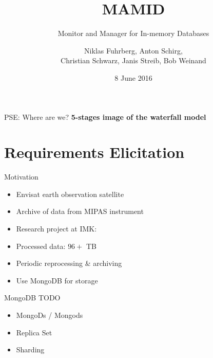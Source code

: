 \documentclass[11pt,aspectratio=169]{beamer}
\begin{document}
   	\author{Niklas Fuhrberg, Anton Schirg,\\ Christian Schwarz, Janis Streib, Bob Weinand}
    \title{MAMID}
    \subtitle{Monitor and Manager for In-memory Databases}
    \date{8 June 2016}
    \subject{Final Presentation}
    
    \frame[plain]{\maketitle}

    \begin{frame}[label=waterfall]{PSE: Where are we?}
        \centering\huge
        \textbf{5-stages image of the waterfall model}
    \end{frame}
    
    \section{Requirements Elicitation}
    
    \begin{frame}{Motivation}
        \begin{itemize}
            \item Envisat earth observation satellite
            \item Archive of data from MIPAS instrument
            \item Research project at IMK: %
            \item {}Processed data: $96+$ TB
            \item Periodic reprocessing \& archiving 
            \item Use MongoDB for storage
        \end{itemize}
    \end{frame}
    
    \begin{frame}{MongoDB}
        TODO
        \begin{itemize}
            \item MongoDs / Mongods
            \item Replica Set
            \item Sharding
        \end{itemize}
    \end{frame}
    
\end{document}
